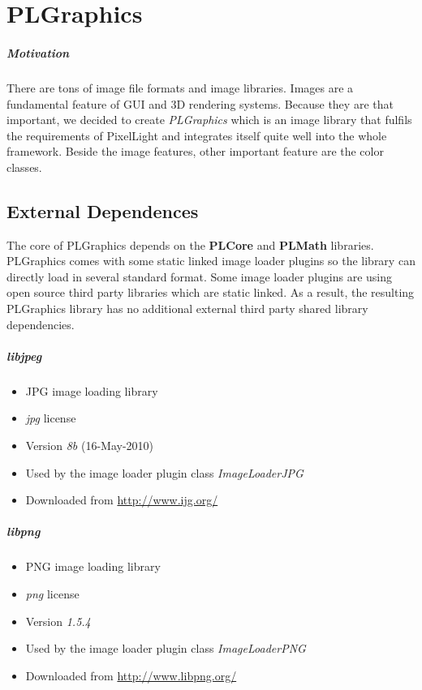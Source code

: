\chapter{PLGraphics}


\paragraph{Motivation}
There are tons of image file formats and image libraries. Images are a fundamental feature of GUI and 3D rendering systems. Because they are that important, we decided to create \emph{PLGraphics} which is an image library that fulfils the requirements of PixelLight and integrates itself quite well into the whole framework. Beside the image features, other important feature are the color classes.




\section{External Dependences}
The core of PLGraphics depends on the \textbf{PLCore} and \textbf{PLMath} libraries. PLGraphics comes with some static linked image loader plugins so the library can directly load in several standard format. Some image loader plugins are using open source third party libraries which are static linked. As a result, the resulting PLGraphics library has no additional external third party shared library dependencies.


\paragraph{libjpeg}
\begin{itemize}
\item JPG image loading library
\item \emph{jpg} license
\item Version \emph{8b} (16-May-2010)
\item Used by the image loader plugin class \emph{ImageLoaderJPG}
\item Downloaded from \url{http://www.ijg.org/}
\end{itemize}


\paragraph{libpng}
\begin{itemize}
\item PNG image loading library
\item \emph{png} license
\item Version \emph{1.5.4}
\item Used by the image loader plugin class \emph{ImageLoaderPNG}
\item Downloaded from \url{http://www.libpng.org/}
\end{itemize}





\cleardoublepage

